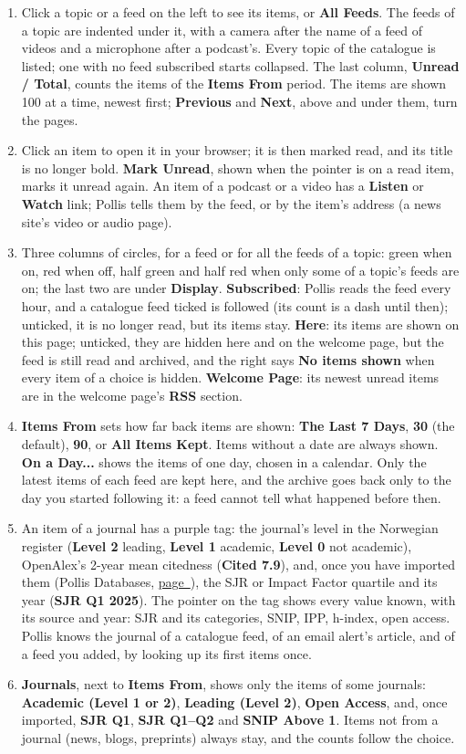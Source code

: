 \documentclass[10pt,a4paper,twoside]{article}
\newcounter{subheadmark}
\newcommand{\pg}[1]{\hyperlink{topic:#1}{page~\pageref*{topic:#1}}}
\newcommand{\subhead}[1]{\par\vspace{5pt}\asklabel{2}{#1}\stepcounter{subheadmark}\pdfbookmark[1]{#1}{subhead:\thesubheadmark}{\color{navy}\large\bfseries #1}\par\vspace{1pt}}
\newcommand{\ui}[1]{\textbf{#1}}
\begin{document}
\subhead{Read}
\begin{enumerate}[label=\arabic*.]
  \item Click a topic or a feed on the left to see its items, or \ui{All Feeds}. The feeds of a topic are
    indented under it, with a camera after the name of a feed of videos and a microphone after a podcast's. Every topic of the catalogue is listed; one with no feed subscribed starts collapsed. The last column, \ui{Unread / Total}, counts the items of the \ui{Items From} period. The items are shown
    100 at a time, newest first; \ui{Previous} and \ui{Next}, above and under them, turn the pages.
  \item Click an item to open it in your browser; it is then marked read, and its title is no longer bold.
    \ui{Mark Unread}, shown when the pointer is on a read item, marks it unread again. An item of a podcast or a video has a \ui{Listen} or \ui{Watch} link; Pollis tells them
    by the feed, or by the item's address (a news site's video or audio page).
  \item Three columns of circles, for a feed or for all the feeds of a topic: green when on, red when off, half green and half red when only some of a topic's feeds are on; the last two are under \ui{Display}. \ui{Subscribed}: Pollis reads the
    feed every hour, and a catalogue feed ticked is followed (its count is a dash until then); unticked, it is no longer read, but its items stay. \ui{Here}: its items are shown on this
    page; unticked, they are hidden here and on the welcome page, but the feed is still read and archived, and
    the right says \ui{No items shown} when every item of a choice is hidden. \ui{Welcome Page}: its newest
    unread items are in the welcome page's \ui{RSS} section.
  \item \ui{Items From} sets how far back items are shown: \ui{The Last 7 Days}, \ui{30} (the default),
    \ui{90}, or \ui{All Items Kept}. Items without a date are always shown. \ui{On a Day...} shows the items of
    one day, chosen in a calendar. Only the latest items of each feed are kept here, and the archive goes back
    only to the day you started following it: a feed cannot tell what happened before then.
  \item An item of a journal has a purple tag: the journal's level in the Norwegian register (\ui{Level 2}
    leading, \ui{Level 1} academic, \ui{Level 0} not academic), OpenAlex's 2-year mean citedness
    (\ui{Cited 7.9}), and, once you have imported them (Pollis Databases, \pg{Pollis Databases}), the SJR or Impact Factor
    quartile and its year (\ui{SJR Q1 2025}). The pointer on the tag shows every value known, with its source
    and year: SJR and its categories, SNIP, IPP, h-index, open access. Pollis knows the journal of a catalogue
    feed, of an email alert's article, and of a feed you added, by looking up its first items once.
  \item \ui{Journals}, next to \ui{Items From}, shows only the items of some journals: \ui{Academic (Level 1 or 2)},
    \ui{Leading (Level 2)}, \ui{Open Access}, and, once imported, \ui{SJR Q1}, \ui{SJR Q1--Q2} and \ui{SNIP Above 1}.
    Items not from a journal (news, blogs, preprints) always stay, and the counts follow the choice.
\end{enumerate}
\end{document}

